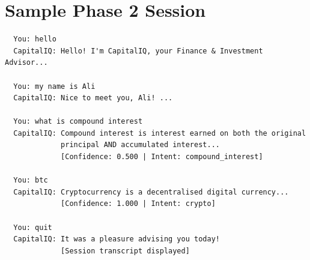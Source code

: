 \documentclass[12pt, a4paper]{article}
\begin{document}
\section{Sample Phase 2 Session}

\begin{infobox}
\begin{verbatim}
  You: hello
  CapitalIQ: Hello! I'm CapitalIQ, your Finance & Investment Advisor...

  You: my name is Ali
  CapitalIQ: Nice to meet you, Ali! ...

  You: what is compound interest
  CapitalIQ: Compound interest is interest earned on both the original
             principal AND accumulated interest...
             [Confidence: 0.500 | Intent: compound_interest]

  You: btc
  CapitalIQ: Cryptocurrency is a decentralised digital currency...
             [Confidence: 1.000 | Intent: crypto]

  You: quit
  CapitalIQ: It was a pleasure advising you today!
             [Session transcript displayed]
\end{verbatim}
\end{infobox}
\end{document}
